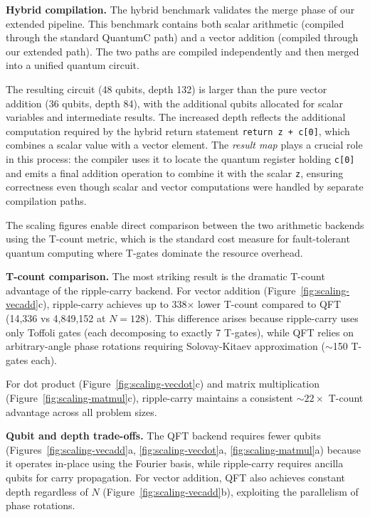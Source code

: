 \textbf{Hybrid compilation.} The hybrid benchmark validates the merge phase of our extended pipeline. This benchmark contains both scalar arithmetic (compiled through the standard QuantumC path) and a vector addition (compiled through our extended path). The two paths are compiled independently and then merged into a unified quantum circuit.

The resulting circuit (48 qubits, depth 132) is larger than the pure vector addition (36 qubits, depth 84), with the additional qubits allocated for scalar variables and intermediate results. The increased depth reflects the additional computation required by the hybrid return statement \texttt{return z + c[0]}, which combines a scalar value with a vector element. The \emph{result map} plays a crucial role in this process: the compiler uses it to locate the quantum register holding \texttt{c[0]} and emits a final addition operation to combine it with the scalar \texttt{z}, ensuring correctness even though scalar and vector computations were handled by separate compilation paths.


The scaling figures enable direct comparison between the two arithmetic backends using the T-count metric, which is the standard cost measure for fault-tolerant quantum computing where T-gates dominate the resource overhead.

\textbf{T-count comparison.} The most striking result is the dramatic T-count advantage of the ripple-carry backend. For vector addition (Figure~\ref{fig:scaling-vecadd}c), ripple-carry achieves up to 338$\times$ lower T-count compared to QFT (14,336 vs 4,849,152 at $N=128$). This difference arises because ripple-carry uses only Toffoli gates (each decomposing to exactly 7 T-gates), while QFT relies on arbitrary-angle phase rotations requiring Solovay-Kitaev approximation ($\sim$150 T-gates each).

For dot product (Figure~\ref{fig:scaling-vecdot}c) and matrix multiplication (Figure~\ref{fig:scaling-matmul}c), ripple-carry maintains a consistent ${\sim}22\times$ T-count advantage across all problem sizes.

\textbf{Qubit and depth trade-offs.} The QFT backend requires fewer qubits (Figures~\ref{fig:scaling-vecadd}a, \ref{fig:scaling-vecdot}a, \ref{fig:scaling-matmul}a) because it operates in-place using the Fourier basis, while ripple-carry requires ancilla qubits for carry propagation. For vector addition, QFT also achieves constant depth regardless of $N$ (Figure~\ref{fig:scaling-vecadd}b), exploiting the parallelism of phase rotations.

